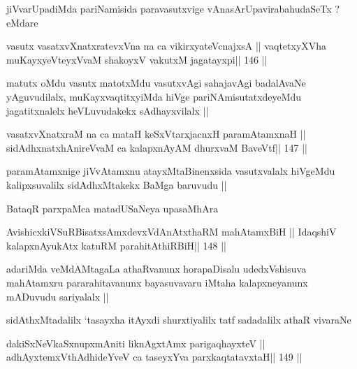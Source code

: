 \begin{artha}
jiVvarUpadiMda pariNamisida paravasutxvige vAnasArUpavirabahudaSeTx ? eMdare
\end{artha}

\begin{shl}
vasutx vasatxvXnatxratevxVna na ca vikirxyateV\s cnajxsA ||
vaqtetxyXVha muKayxyeVteyxVvaM shakoyxV vakutxM jagatayxpi\hfill || 146 ||
\end{shl}

\begin{artha}
matutx oMdu vasutx matotxMdu vasutxvAgi sahajavAgi badalAvaNe
yAguvudilalx, muKayxvaqtitxyiMda hiVge pariNAmisutatxdeyeMdu
jagatitxnalelx heVLuvudakekx sAdhayxvilalx ||
\end{artha}

\begin{shl}
vasatxvXnatxraM na ca mataH keSxVtarxjacnxH paramAtamxnaH ||
sidAdhxnatxhAnireVvaM ca kalapxnAyAM dhurxvaM BaveVtf\hfill || 147 ||
\end{shl}

\begin{artha}
paramAtamxnige jiVvAtamxnu atayxMtaBinenxsida vasutxvalalx hiVgeMdu
kalipxsuvalilx sidAdhxMtakekx BaMga baruvudu ||
\end{artha}

\begin{artha}
BataqR parxpaMca matadUSaNeya upasaMhAra
\end{artha}

\begin{shl}
AvishicxkiVSuRBisatxsAmxdevxVdAnAtxthaRM mahAtamxBiH ||
IdaqshiV kalapxnA\s yukAtx katuRM parahitAthiRBiH\hfill || 148 ||
\end{shl}

\begin{artha}
adariMda veMdAMtagaLa athaRvanunx horapaDisalu udedxVshisuva
mahAtamxru pararahitavanunx bayasuvavaru iMtaha kalapxneyanunx
mADuvudu sariyalalx ||
\end{artha}

\begin{artha}
sidAthxMtadalilx `tasayxha itAyxdi shurxtiyalilx tatf sadadalilx athaR
vivaraNe 
\end{artha}

\begin{shl}
dakiSxNeV\s kaSxnupxmAniti liknAgxtAmx parigaqhayxteV ||
adhAyxtemxV\s thAdhideYveV ca taseyxYva parxkaqtatavxtaH\hfill || 149 ||
\end{shl}

